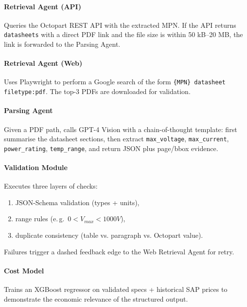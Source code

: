 \paragraph{Retrieval Agent (API)}  
Queries the Octopart REST API with the extracted MPN.  
If the API returns \verb|datasheets| with a direct PDF link and the file size is within 50 kB–20 MB, the link is forwarded to the Parsing Agent.

\paragraph{Retrieval Agent (Web)}  
Uses Playwright to perform a Google search of the form  
\texttt{\{MPN\} datasheet filetype:pdf}.  
The top-3 PDFs are downloaded for validation.

\paragraph{Parsing Agent}  
Given a PDF path, calls GPT-4 Vision with a chain-of-thought template: first summarise the datasheet sections, then extract \verb|max_voltage|, \verb|max_current|, \verb|power_rating|, \verb|temp_range|, and return JSON plus page/bbox evidence.

\paragraph{Validation Module}  
Executes three layers of checks:
\begin{enumerate}
  \item JSON-Schema validation (types + units),
  \item range rules (e.\,g.\ $0 < V_{max} < 1000V$),
  \item duplicate consistency (table vs. paragraph vs. Octopart value).
\end{enumerate}  
Failures trigger a dashed feedback edge to the Web Retrieval Agent for retry.

\paragraph{Cost Model}  
Trains an XGBoost regressor on validated specs + historical SAP prices to demonstrate the economic relevance of the structured output.

